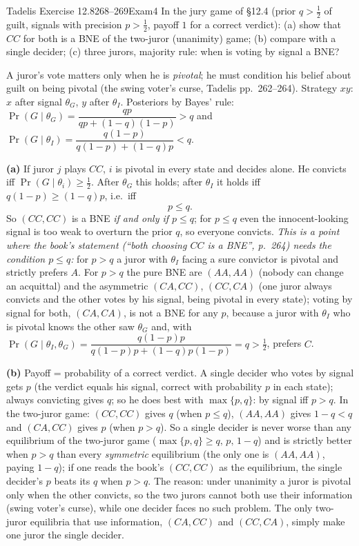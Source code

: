 \begin{exsol}{Tadelis Exercise 12.8}{268--269}{Exam}{4}
\asked In the jury game of \S12.4 (prior $q>\tfrac12$ of guilt, signals with precision $p>\tfrac12$,
payoff $1$ for a correct verdict): (a) show that $CC$ for both is a BNE of the two-juror
(unanimity) game; (b) compare with a single decider; (c) three jurors, majority rule: when is
voting by signal a BNE?

\method A juror's vote matters only when he is \emph{pivotal}; he must condition his belief
about guilt on being pivotal (the swing voter's curse, Tadelis pp.~262--264). Strategy $xy$:
$x$ after signal $\theta_G$, $y$ after $\theta_I$. Posteriors by Bayes' rule:
$\Pr(G\mid\theta_G)=\dfrac{qp}{qp+(1-q)(1-p)}>q$ and $\Pr(G\mid\theta_I)=\dfrac{q(1-p)}{q(1-p)+(1-q)p}<q$.

\solution
\textbf{(a)} If juror $j$ plays $CC$, $i$ is pivotal in every state and decides alone. He convicts iff
$\Pr(G\mid\theta_i)\ge\tfrac12$. After $\theta_G$ this holds; after $\theta_I$ it holds iff
$q(1-p)\ge(1-q)p$, i.e.\ iff
\[
  p\le q .
\]
So $(CC,CC)$ is a BNE \emph{if and only if $p\le q$}; for $p\le q$ even the innocent-looking signal is
too weak to overturn the prior $q$, so everyone convicts. \emph{This is a point where the
book's statement (``both choosing $CC$ is a BNE'', p.~264) needs the condition $p\le q$:}
for $p>q$ a juror with $\theta_I$ facing a sure convictor is pivotal and strictly prefers $A$.
For $p>q$ the pure BNE are $(AA,AA)$ (nobody can change an acquittal) and the asymmetric
$(CA,CC)$, $(CC,CA)$ (one juror always convicts and the other votes by his signal, being
pivotal in every state); voting by signal for both, $(CA,CA)$, is not a BNE for any $p$, because
a juror with $\theta_I$ who is pivotal knows the other saw $\theta_G$ and, with
$\Pr(G\mid\theta_I,\theta_G)=\dfrac{q(1-p)p}{q(1-p)p+(1-q)p(1-p)}=q>\tfrac12$, prefers $C$.

\textbf{(b)} Payoff = probability of a correct verdict. A single decider who votes by signal gets
$p$ (the verdict equals his signal, correct with probability $p$ in each state); always
convicting gives $q$; so he does best with $\max\{p,q\}$: by signal iff $p>q$. In the
two-juror game: $(CC,CC)$ gives $q$ (when $p\le q$), $(AA,AA)$ gives $1-q<q$ and $(CA,CC)$ gives $p$
(when $p>q$). So a single decider is never worse than any equilibrium of the two-juror game
($\max\{p,q\}\ge q,\,p,\,1-q$) and is strictly better when $p>q$ than every \emph{symmetric}
equilibrium (the only one is $(AA,AA)$, paying $1-q$); if one reads the book's $(CC,CC)$ as the
equilibrium, the single decider's $p$ beats its $q$ when $p>q$. The reason: under unanimity a
juror is pivotal only when the other convicts, so the two jurors cannot both use their
information (swing voter's curse), while one decider faces no such problem. The only two-juror
equilibria that use information, $(CA,CC)$ and $(CC,CA)$, simply make one juror the single decider.


\end{exsol}
